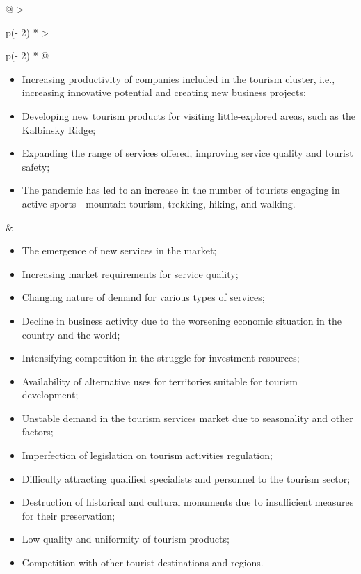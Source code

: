 \begin{longtable}[]{@{}
  >{\raggedright\arraybackslash}p{(\columnwidth - 2\tabcolsep) * }
  >{\raggedright\arraybackslash}p{(\columnwidth - 2\tabcolsep) * }@{}}
\begin{minipage}[t]{\linewidth}
\begin{itemize}
  heritage sites;
\item
  Increasing productivity of companies included in the tourism cluster,
  i.e., increasing innovative potential and creating new business
  projects;
\item
  Developing new tourism products for visiting little-explored areas,
  such as the Kalbinsky Ridge;
\item
  Expanding the range of services offered, improving service quality and
  tourist safety;
\item
  The pandemic has led to an increase in the number of tourists engaging
  in active sports - mountain tourism, trekking, hiking, and walking.
\end{itemize}
\end{minipage} & \begin{minipage}[t]{\linewidth}\raggedright
\begin{itemize}
\item
  The emergence of new services in the market;
\item
  Increasing market requirements for service quality;
\item
  Changing nature of demand for various types of services;
\item
  Decline in business activity due to the worsening economic situation
  in the country and the world;
\item
  Intensifying competition in the struggle for investment resources;
\item
  Availability of alternative uses for territories suitable for tourism
  development;
\item
  Unstable demand in the tourism services market due to seasonality and
  other factors;
\item
  Imperfection of legislation on tourism activities regulation;
\item
  Difficulty attracting qualified specialists and personnel to the
  tourism sector;
\item
  Destruction of historical and cultural monuments due to insufficient
  measures for their preservation;
\item
  Low quality and uniformity of tourism products;
\item
  Competition with other tourist destinations and regions.
\end{itemize}
\end{minipage} \\
\end{longtable}

